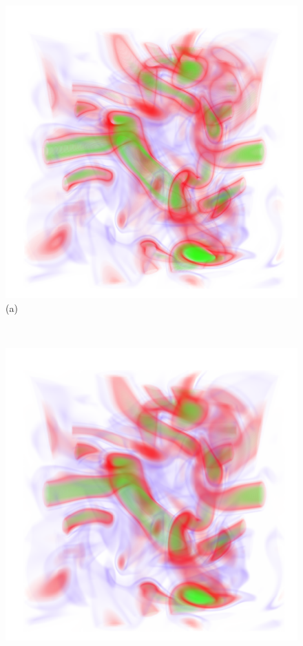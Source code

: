 \documentclass[twoside,twocolumn,10pt]{article}
\begin{document}
\begin{figure}
	\centering
	\begin{minipage}{.16\textwidth}
		\centering
		\includegraphics[width=1\linewidth]{crop/vortex_merged_green_red_purple}
		(a)
	\end{minipage}~
	\begin{minipage}{.16\textwidth}
		\centering
		\includegraphics[width=1\linewidth]{crop/vortex_merged_segment_blend_green_red_purple}

\end{minipage}
\end{figure}
\end{document}

